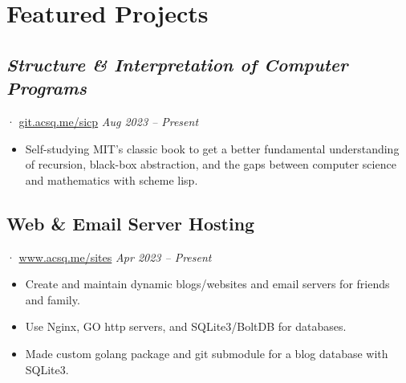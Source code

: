 \documentclass[12pt]{article}
\newcommand{\itemspace}{\vspace{0.1870em}}
\renewcommand{\textsc}[1]{\uppercase{\footnotesize#1}\normalsize}
\begin{document}
\itemspace

\section{Featured Projects}

\subsection{\textit{Structure \& Interpretation of Computer Programs}} ·
\href{https://git.acsq.me/sicp/about/}{git.acsq.me/sicp}
\hfill \textit{Aug 2023 -- Present}

\begin{itemize}[noitemsep,nolistsep]
  \item Self-studying MIT's classic book to get a better fundamental
    understanding of recursion, black-box abstraction, and the gaps between computer
    science and mathematics with scheme lisp.
\end{itemize}

\itemspace

\subsection{Web \& Email Server Hosting} ·
\href{https://www.acsq.me/sites}{www.acsq.me/sites}
\hfill \textit{Apr 2023 -- Present}

\begin{itemize}[noitemsep,nolistsep]
  \item Create and maintain dynamic blogs/websites and email servers for
    friends and family.

  \item Use Nginx, \textsc{go} http servers, and SQLite3/BoltDB for databases.

  \item Made custom golang package and git submodule for a blog database with SQLite3.
\end{itemize}

\itemspace

\end{document}
